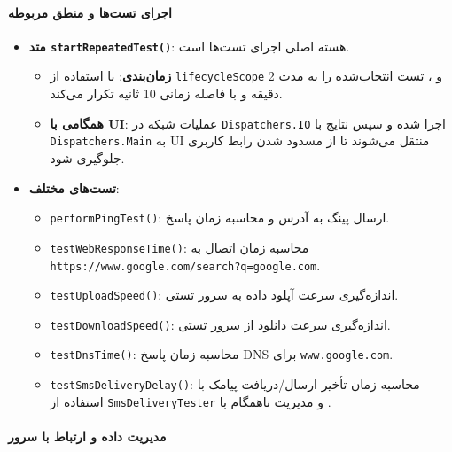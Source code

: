 \documentclass{report}
\begin{document}
\paragraph{اجرای تست‌ها و منطق مربوطه}

\begin{itemize}
	\item \textbf{متد \texttt{startRepeatedTest()}}: هسته اصلی اجرای تست‌ها است.
	\begin{itemize}
		\item \textbf{زمان‌بندی}: با استفاده از \texttt{lifecycleScope} و ، تست انتخاب‌شده را به مدت 2 دقیقه و با فاصله زمانی 10 ثانیه تکرار می‌کند.
		\item \textbf{همگامی با UI}: عملیات شبکه در \texttt{Dispatchers.IO} اجرا شده و سپس نتایج با \texttt{Dispatchers.Main} به UI منتقل می‌شوند تا از مسدود شدن رابط کاربری جلوگیری شود.
	\end{itemize}
	\item \textbf{تست‌های مختلف}:
	\begin{itemize}
		\item \texttt{performPingTest()}: ارسال پینگ به آدرس و محاسبه زمان پاسخ.
		\item \texttt{testWebResponseTime()}: محاسبه زمان اتصال به \texttt{https://www.google.com/search?q=google.com}.
		\item \texttt{testUploadSpeed()}: اندازه‌گیری سرعت آپلود داده به سرور تستی.
		\item \texttt{testDownloadSpeed()}: اندازه‌گیری سرعت دانلود از سرور تستی.
		\item \texttt{testDnsTime()}: محاسبه زمان پاسخ DNS برای \texttt{www.google.com}.
		\item \texttt{testSmsDeliveryDelay()}: محاسبه زمان تأخیر ارسال/دریافت پیامک با استفاده از \texttt{SmsDeliveryTester} و مدیریت ناهمگام با .
	\end{itemize}
\end{itemize}

\paragraph{مدیریت داده و ارتباط با سرور}
\end{document}
